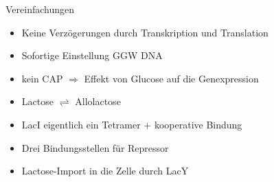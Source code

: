 \documentclass[11pt,aspectratio=169,reqno]{beamer}
\begin{document}
\begin{frame}{Vereinfachungen}
    \begin{itemize}
        \item Keine Verzögerungen durch Transkription und Translation
        \item Sofortige Einstellung GGW DNA

        \item kein CAP $\Rightarrow$ Effekt von Glucose auf die Genexpression
        \item Lactose $\rightleftharpoons$ Allolactose
        \item LacI eigentlich ein Tetramer + kooperative Bindung
        \item Drei Bindungsstellen für Repressor
        \item Lactose-Import in die Zelle durch LacY
    \end{itemize}
\end{frame}
\end{document}
